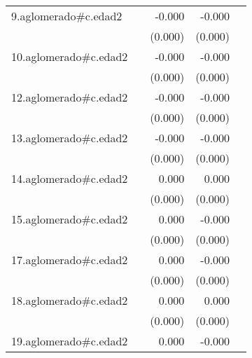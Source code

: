 {\begin{longtable}{l*{4}{D{.}{.}{-1}}}
\addlinespace
9.aglomerado#c.edad2&                     &      -0.000         &      -0.000\sym{***}&                     \\
            &                     &     (0.000)         &     (0.000)         &                     \\
\addlinespace
10.aglomerado#c.edad2&                     &      -0.000         &      -0.000\sym{***}&                     \\
            &                     &     (0.000)         &     (0.000)         &                     \\
\addlinespace
12.aglomerado#c.edad2&                     &      -0.000         &      -0.000\sym{*}  &                     \\
            &                     &     (0.000)         &     (0.000)         &                     \\
\addlinespace
13.aglomerado#c.edad2&                     &      -0.000         &      -0.000\sym{*}  &                     \\
            &                     &     (0.000)         &     (0.000)         &                     \\
\addlinespace
14.aglomerado#c.edad2&                     &       0.000         &       0.000         &                     \\
            &                     &     (0.000)         &     (0.000)         &                     \\
\addlinespace
15.aglomerado#c.edad2&                     &       0.000         &      -0.000         &                     \\
            &                     &     (0.000)         &     (0.000)         &                     \\
\addlinespace
17.aglomerado#c.edad2&                     &       0.000         &      -0.000         &                     \\
            &                     &     (0.000)         &     (0.000)         &                     \\
\addlinespace
18.aglomerado#c.edad2&                     &       0.000         &       0.000\sym{*}  &                     \\
            &                     &     (0.000)         &     (0.000)         &                     \\
\addlinespace
19.aglomerado#c.edad2&                     &       0.000         &      -0.000         &                     \\

\end{longtable}}
